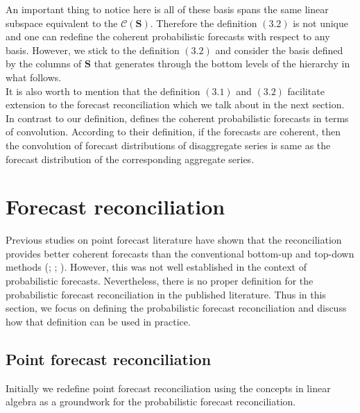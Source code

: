 \documentclass[a4paper, 11pt]{article}
\begin{document}
\noindent
An important thing to notice here is all of these basis spans the same linear subspace equivalent to the $\mathscr{C}(\bm{S})$. Therefore the definition $(3.2)$ is not unique and one can redefine the coherent probabilistic forecasts with respect to any basis. However, we stick to the definition $(3.2)$ and consider the basis defined by the columns of $\bm{S}$ that generates through the bottom levels of the hierarchy in what follows.\\ 

\noindent
It is also worth to mention that the definition $(3.1)$ and $(3.2)$ facilitate extension to the forecast reconciliation which we talk about in the next section. In contrast to our definition, \citet{BenTaieb2017} defines the coherent probabilistic forecasts in terms of convolution. According to their definition, if the forecasts are coherent, then the convolution of forecast distributions of disaggregate series is same as the forecast distribution of the corresponding aggregate series.  

\section{Forecast reconciliation}

Previous studies on point forecast literature have shown that the reconciliation provides better coherent forecasts than the conventional bottom-up and top-down methods (\cite{Hyndman2011}; \cite{VanErven2015a}; \cite{Wickramasuriya2017}). However, this was not well established in the context of probabilistic forecasts. Nevertheless, there is no proper definition for the probabilistic forecast reconciliation in the published literature. Thus in this section, we focus on defining the probabilistic forecast reconciliation and discuss how that definition can be used in practice.  


\subsection{Point forecast reconciliation}

Initially we redefine point forecast reconciliation using the concepts in linear algebra as a groundwork for the probabilistic forecast reconciliation. \\
\end{document}
